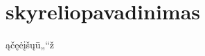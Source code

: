 \documentclass[a4paper,11pt,twoside]{book}
\begin{document}
\section{skyreliopavadinimas} %



\begin{thm} 
  ąčęėįšųū„“ž
\end{thm}
\end{document}
